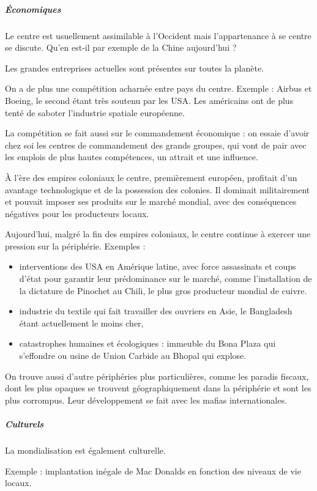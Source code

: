\documentclass[a4paper,10pt]{article}
\begin{document}
			\subparagraph{Économiques}

			Le centre est usuellement assimilable à l'Occident mais l'appartenance à se centre se discute.
			Qu'en est-il par exemple de la Chine aujourd'hui ?

			Les grandes entreprises actuelles sont présentes sur toutes la planète.

			On a de plus une compétition acharnée entre pays du centre.
			Exemple : Airbus et Boeing, le second étant très soutenu par les USA.
			Les américains ont de plus tenté de saboter l'industrie spatiale européenne.

			La compétition se fait aussi sur le commandement économique : on essaie d'avoir chez soi les centres de commandement des grands groupes, qui vont de pair avec les emplois de plus hautes compétences, un attrait et une influence.

			À l'ère des empires coloniaux le centre, premièrement européen, profitait d'un avantage technologique et de la possession des colonies.
			Il dominait militairement et pouvait imposer ses produits sur le marché mondial, avec des conséquences négatives pour les producteurs locaux.

			Aujourd'hui, malgré la fin des empires coloniaux, le centre continue à exercer une pression sur la périphérie.
			Exemples :
			\begin{itemize}
			\item interventions des USA en Amérique latine, avec force assassinats et coups d'état pour garantir leur prédominance sur le marché, comme l'installation de la dictature de Pinochet au Chili, le plus gros producteur mondial de cuivre.
			\item industrie du textile qui fait travailler des ouvriers en Asie, le Bangladesh étant actuellement le moins cher,
			\item catastrophes humaines et écologiques : immeuble du Bona Plaza qui s'effondre ou usine de Union Carbide au Bhopal qui explose.
			\end{itemize}

			On trouve aussi d'autre périphéries plus particulières, comme les paradis fiscaux, dont les plus opaques se trouvent géographiquement dans la périphérie et sont les plus corrompus.
			Leur développement se fait avec les mafias internationales.

			\subparagraph{Culturels}

			La mondialisation est également culturelle.

			Exemple : implantation inégale de Mac Donalds en fonction des niveaux de vie locaux.
\end{document}
